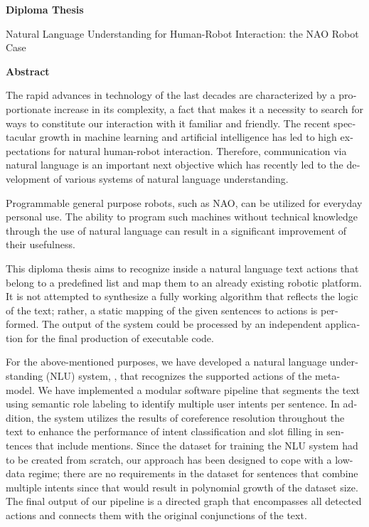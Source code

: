 \begin{english}
{}

\begin{center}
    \textbf{\Large{Diploma Thesis}}

    \vspace{0.3cm}
    \large{Natural Language Understanding for Human-Robot Interaction: the NAO Robot Case}

    \vspace{0.1cm}
    \textbf{Abstract}
\end{center}

The rapid advances in technology of the last decades are characterized by a proportionate increase in its complexity, a fact that makes it a necessity to search for ways to constitute our interaction with it familiar and friendly.
The recent spectacular growth in machine learning and artificial intelligence has led to high expectations for natural human-robot interaction.
Therefore, communication via natural language is an important next objective which has recently led to the development of various systems of natural language understanding.

Programmable general purpose robots, such as NAO, can be utilized for everyday personal use.
The ability to program such machines without technical knowledge through the use of natural language can result in a significant improvement of their usefulness.

This diploma thesis aims to recognize inside a natural language text actions that belong to a predefined list and map them to an already existing robotic platform.
It is not attempted to synthesize a fully working algorithm that reflects the logic of the text; rather, a static mapping of the given sentences to actions is performed.
The output of the system could be processed by an independent application for the final production of executable code.

For the above-mentioned purposes, we have developed a natural language understanding (NLU) system, \projectname{}, that recognizes the supported actions of the \metamodel{} meta-model.
We have implemented a modular software pipeline that segments the text using semantic role labeling to identify multiple user intents per sentence.
In addition, the system utilizes the results of coreference resolution throughout the text to enhance the performance of intent classification and slot filling in sentences that include mentions.
Since the dataset for training the NLU system had to be created from scratch, our approach has been designed to cope with a low-data regime;
there are no requirements in the dataset for sentences that combine multiple intents since that would result in polynomial growth of the dataset size.
The final output of our pipeline is a directed graph that encompasses all detected actions and connects them with the original conjunctions of the text.


\end{english}
